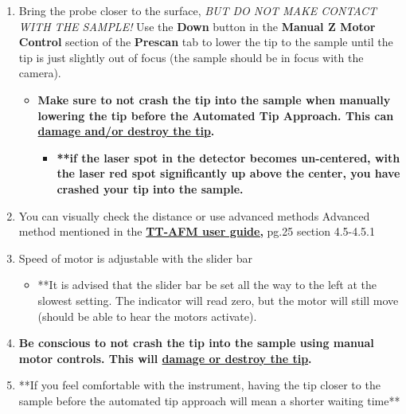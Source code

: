 \documentclass{../lab}
\begin{document}
\begin{enumerate}
    \item Bring the probe closer to the surface, \emph{BUT DO NOT MAKE CONTACT WITH THE SAMPLE!} Use the \textbf{Down} button in the \textbf{Manual Z Motor Control} section of the \textbf{Prescan} tab to lower the tip to the sample until the tip is just slightly out of focus (the sample should be in focus with the camera).
    \begin{itemize}
        \item \textbf{Make sure to not crash the tip into the sample when manually lowering the tip before the Automated Tip Approach. This can \hyperref[subsec:BrokenTip]{damage and/or destroy the tip}.}
        \begin{itemize}
            \item \textbf{**if the laser spot in the detector becomes un-centered, with the laser red spot significantly up above the center, you have crashed your tip into the sample.}
        \end{itemize}
    \end{itemize}
    
    \item You can visually check the distance or use advanced methods
    Advanced method mentioned in the \href{http://experimentationlab.berkeley.edu/tt-afmuserguidev2.2}{\textbf{TT-AFM user guide,}} pg.25 section 4.5-4.5.1
    
    \item Speed of motor is adjustable with the slider bar
    \begin{itemize}
        \item **It is advised that the slider bar be set all the way to the left at the slowest setting.  The indicator will read zero, but the motor will still move (should be able to hear the motors activate).
    \end{itemize}
    
    \item\textbf{Be conscious to not crash the tip into the sample using manual motor controls. This will \hyperref[subsec:BrokenTip]{damage or destroy the tip}.}
    
    \item **If you feel comfortable with the instrument, having the tip closer to the sample before the automated tip approach will mean a shorter waiting time**
    

\end{enumerate}
\end{document}
